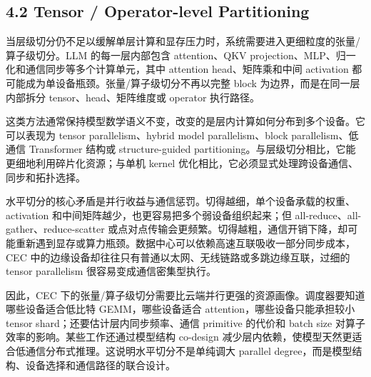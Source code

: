 \documentclass[a4paper,twocolumn,10pt]{ctexart}
\begin{document}
\subsection{4.2 Tensor / Operator-level Partitioning}

当层级切分仍不足以缓解单层计算和显存压力时，系统需要进入更细粒度的张量/算子级切分。LLM 的每一层内部包含 attention、QKV projection、MLP、归一化和通信同步等多个计算单元，其中 attention head、矩阵乘和中间 activation 都可能成为单设备瓶颈。张量/算子级切分不再以完整 block 为边界，而是在同一层内部拆分 tensor、head、矩阵维度或 operator 执行路径。


这类方法通常保持模型数学语义不变，改变的是层内计算如何分布到多个设备。它可以表现为 tensor parallelism、hybrid model parallelism、block parallelism、低通信 Transformer 结构或 structure-guided partitioning。与层级切分相比，它能更细地利用碎片化资源；与单机 kernel 优化相比，它必须显式处理跨设备通信、同步和拓扑选择。


水平切分的核心矛盾是并行收益与通信惩罚。切得越细，单个设备承载的权重、activation 和中间矩阵越少，也更容易把多个弱设备组织起来；但 all-reduce、all-gather、reduce-scatter 或点对点传输会更频繁。切得越粗，通信开销下降，却可能重新遇到显存或算力瓶颈。数据中心可以依赖高速互联吸收一部分同步成本，CEC 中的边缘设备却往往只有普通以太网、无线链路或多跳边缘互联，过细的 tensor parallelism 很容易变成通信密集型执行。


因此，CEC 下的张量/算子级切分需要比云端并行更强的资源画像。调度器要知道哪些设备适合低比特 GEMM，哪些设备适合 attention，哪些设备只能承担较小 tensor shard；还要估计层内同步频率、通信 primitive 的代价和 batch size 对算子效率的影响。某些工作还通过模型结构 co-design 减少层内依赖，使模型天然更适合低通信分布式推理。这说明水平切分不是单纯调大 parallel degree，而是模型结构、设备选择和通信路径的联合设计。
\end{document}
